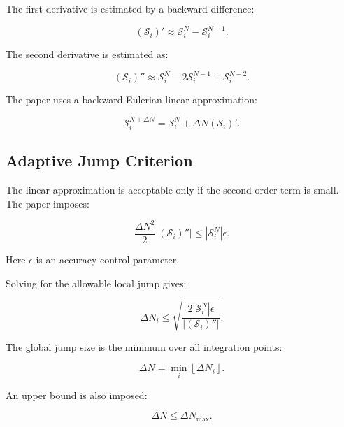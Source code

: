 \documentclass[11pt,a4paper]{article}
\begin{document}
The first derivative is estimated by a backward difference:

\begin{equation}
(\mathcal{S}_{i})'
\approx
\mathcal{S}_{i}^{N}
-
\mathcal{S}_{i}^{N-1}.
\end{equation}

The second derivative is estimated as:

\begin{equation}
(\mathcal{S}_{i})''
\approx
\mathcal{S}_{i}^{N}
-
2\mathcal{S}_{i}^{N-1}
+
\mathcal{S}_{i}^{N-2}.
\end{equation}

The paper uses a backward Eulerian linear approximation:

\begin{equation}
\mathcal{S}_{i}^{N+\Delta N}
=
\mathcal{S}_{i}^{N}
+
\Delta N
(\mathcal{S}_{i})' .
\end{equation}

\subsection{Adaptive Jump Criterion}

The linear approximation is acceptable only if the second-order term is small. The paper imposes:

\begin{equation}
\frac{\Delta N^2}{2}
\left|
(\mathcal{S}_{i})''
\right|
\leq
\left|
\mathcal{S}_{i}^{N}
\right|\epsilon .
\end{equation}

Here $\epsilon$ is an accuracy-control parameter.

Solving for the allowable local jump gives:

\begin{equation}
\Delta N_i
\leq
\sqrt{
\frac{
2|\mathcal{S}_{i}^{N}|\epsilon
}
{
|(\mathcal{S}_{i})''|
}
}.
\end{equation}

The global jump size is the minimum over all integration points:

\begin{equation}
\Delta N
=
\min_i
\left\lfloor
\Delta N_i
\right\rfloor .
\end{equation}

An upper bound is also imposed:

\begin{equation}
\Delta N \leq \Delta N_{\max}.
\end{equation}
\end{document}
